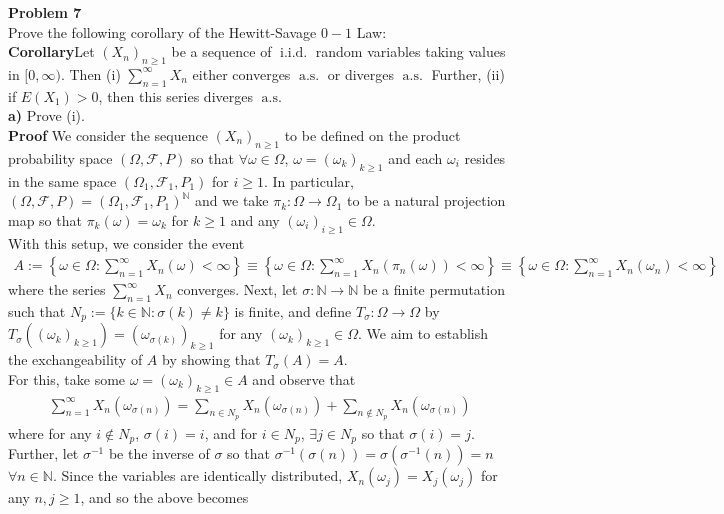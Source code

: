 \documentclass[10pt]{article}
\newcommand{\mbb}[1]{\mathbb{#1}}
\newcommand{\1}[1]{\mathbbm{1}_{#1}}
\newcommand{\mc}[1]{\mathcal{#1}}
\DeclareMathOperator{\as}{a.s.}
\DeclareMathOperator{\iid}{i.i.d.}
\begin{document}
    {\bf Problem 7}\\[5pt]
    Prove the following corollary of the Hewitt-Savage $0-1$ Law:\\[5pt]
    {\bf Corollary}\hspace{5pt}Let $(X_n)_{n\geq 1}$ be a sequence of $\iid$ random variables taking values in $[0,\infty)$. Then (i) $\sum_{n=1}^\infty X_n$ either converges $\as$ or diverges $\as$ Further, (ii) if $E(X_1)>0$, then this series diverges $\as$\\[5pt]
    {\bf a)}\hspace{5pt} Prove (i).\\[5pt]
    {\bf Proof}\hspace{5pt} We consider the sequence $(X_n)_{n\geq 1}$ to be defined on the product probability space $(\Omega,\mc{F},P)$ so that $\forall\omega\in\Omega$, $\omega=(\omega_k)_{k\geq 1}$ and each $\omega_i$ resides in the same space $(\Omega_1,\mc{F}_1,P_1)$ for $i\geq 1$. In particular, $(\Omega,\mc{F},P)=(\Omega_1,\mc{F}_1,P_1)^{\mbb{N}}$ and we take $\pi_k:\Omega\rightarrow\Omega_1$ to be a natural projection map so that $\pi_k(\omega)=\omega_k$ for $k\geq 1$ and any $(\omega_i)_{i\geq 1}\in\Omega$.\\[5pt]
    With this setup, we consider the event
    \begin{align*}
        A:=\left\{\omega\in\Omega:\sum_{n=1}^\infty X_n(\omega)<\infty\right\}\equiv\left\{\omega\in\Omega:\sum_{n=1}^\infty X_n(\pi_n(\omega))<\infty\right\}\equiv \left\{\omega\in\Omega:\sum_{n=1}^\infty X_n(\omega_n)<\infty\right\}
    \end{align*}
    where the series $\sum_{n=1}^\infty X_n$ converges. Next, let $\sigma:\mbb{N}\rightarrow\mbb{N}$ be a finite permutation such that $N_p:=\{k\in\mbb{N}:\sigma(k)\neq k\}$ is finite, and define $T_\sigma:\Omega\rightarrow\Omega$ by $T_\sigma((\omega_k)_{k\geq 1})=(\omega_{\sigma(k)})_{k\geq 1}$ for any $(\omega_k)_{k\geq 1}\in\Omega$. We aim to establish the exchangeability of $A$ by showing that $T_\sigma(A)=A$.\\[5pt]
    For this, take some $\omega=(\omega_k)_{k\geq 1}\in A$ and observe that
    \begin{align*}
        \sum_{n=1}^\infty X_n(\omega_{\sigma(n)})=\sum_{n\in N_p}X_n(\omega_{\sigma(n)})+\sum_{n\notin N_p}X_n(\omega_{\sigma(n)})
    \end{align*}
    where for any $i\notin N_p$, $\sigma(i)=i$, and for $i\in N_p$, $\exists j\in N_p$ so that $\sigma(i)=j$. Further, let $\sigma^{-1}$ be the inverse of $\sigma$ so that $\sigma^{-1}(\sigma(n))=\sigma(\sigma^{-1}(n))=n$ $\forall n\in\mathbb{N}$. Since the variables are identically distributed, $X_n(\omega_j)=X_j(\omega_j)$ for any $n,j\geq 1$, and so the above becomes
\end{document}
